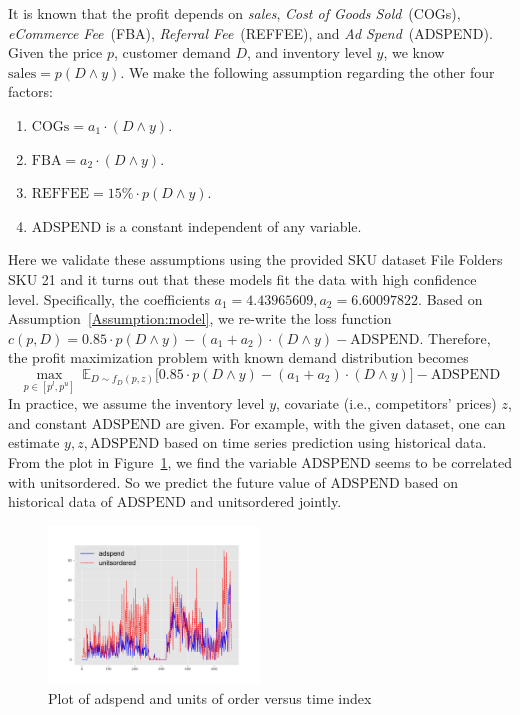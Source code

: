 \documentclass[competition,nonblindrev]{informs3-competition}
\begin{document}
It is known that the profit depends on \emph{sales}, \emph{Cost of Goods Sold}~(COGs), \emph{eCommerce Fee}~(FBA), \emph{Referral Fee}~(REFFEE), and \emph{Ad Spend}~(ADSPEND). 
Given the price $p$, customer demand $D$, and inventory level $y$, we know $\mathrm{sales}=p(D\land y)$.
We make the following assumption regarding the other four factors:
\begin{assumption}\label{Assumption:model}
\begin{enumerate}
    \item 
$\mathrm{COGs} = a_1\cdot(D\land y)$.
    \item
$\mathrm{FBA} = a_2\cdot(D\land y)$.
    \item
$\mathrm{REFFEE} =15\%\cdot p(D\land y)$.
     \item
$\mathrm{ADSPEND}$ is a constant independent of any variable.
\end{enumerate}
\end{assumption}
Here we validate these assumptions using the provided SKU dataset \textsf{File Folders SKU 21} and it turns out that these models fit the data with high confidence level.
Specifically, the coefficients $a_1=4.43965609, a_2=6.60097822$.
Based on Assumption~\ref{Assumption:model}, we re-write the loss function $c(p,D)=0.85\cdot p(D\land y) - (a_1+a_2)\cdot (D\land y) - \mathrm{ADSPEND}$.
Therefore, the profit maximization problem with known demand distribution becomes
\begin{equation}\label{Eq:true:loss}
\max_{p\in[p^l, p^u]}~\mathbb{E}_{D\sim f_D(p,z)}\Big[ 
0.85\cdot p(D\land y) - (a_1+a_2)\cdot (D\land y) 
\Big] - \mathrm{ADSPEND}
\end{equation}
In practice, we assume the inventory level $y$, covariate (i.e., competitors' prices) $z$, and constant $\mathrm{ADSPEND}$ are given.
For example, with the given dataset, one can estimate $y, z, \mathrm{ADSPEND}$ based on time series prediction using historical data.
From the plot in Figure~\ref{fig:adspend}, we find the variable $\mathrm{ADSPEND}$ seems to be correlated with $\mathrm{unitsordered}$.
So we predict the future value of $\mathrm{ADSPEND}$ based on historical data of $\mathrm{ADSPEND}$ and $\mathrm{unitsordered}$ jointly.
\begin{figure}[t]
    \centering
    \includegraphics[width=0.5\textwidth]{adspend_units.pdf}
    \caption{Plot of adspend and units of order versus time index}
    \label{fig:adspend}
\end{figure}
\end{document}
